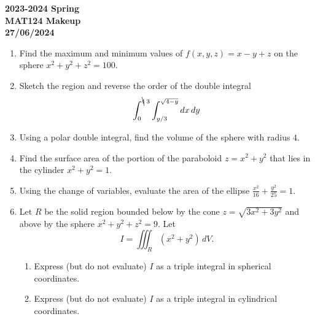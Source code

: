 \documentclass[a4paper, 12pt]{article}
\renewcommand{\headrulewidth}{0pt}
\begin{document}
\pagestyle{empty}

\begin{center}
\textbf{2023-2024 Spring \\MAT124 Makeup\\27/06/2024}
\end{center}

\begin{enumerate}[leftmargin=*,label=\textbf{\arabic*.}]
\item Find the maximum and minimum values of $f(x,y,z)=x-y+z$ on the sphere $x^2+y^2+z^2=100$.

\item Sketch the region and reverse the order of the double integral
\[\int_0^{\bcancel4\:3}\int_{y/3}^{\sqrt{4-y}}dx\,dy\]

\item Using a polar double integral, find the volume of the sphere with radius $4$.

\item Find the surface area of the portion of the paraboloid $z=x^2+y^2$ that lies in the cylinder $x^2+y^2=1$.

\item Using the change of variables, evaluate the area of the ellipse $\displaystyle\frac{x^2}{16}+\frac{y^2}{25}=1$.

\item Let $R$ be the solid region bounded below by the cone $z=\sqrt{3x^2+3y^2}$ and above by the sphere $x^2+y^2+z^2=9$. Let
\[{I}=\iiint_R(x^2+y^2)\,dV.\]

\begin{enumerate}[leftmargin=*,label=\textbf{\alph*.}]
\item Express (but do not evaluate) ${I}$ as a triple integral in spherical coordinates.
\item Express (but do not evaluate) ${I}$ as a triple integral in cylindrical coordinates.
\end{enumerate}
\end{enumerate}

\newpage
\pagestyle{fancy}
\renewcommand{\headrulewidth}{1pt}

\end{document}
